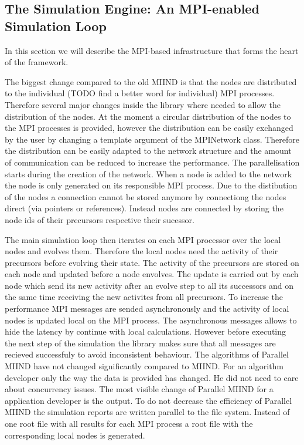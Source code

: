 \documentclass[12pt]{article}
\begin{document}
\subsection{The Simulation Engine: An MPI-enabled Simulation Loop}%
In this section we will describe the MPI-based infrastructure that forms the heart of the framework.

The biggest change compared to the old MIIND is that the nodes are distributed to the individual (TODO find a better word for individual) MPI processes. Therefore several major changes inside the library where needed to allow the distribution of the nodes. At the moment a circular distribution of the nodes to the MPI processes is provided, however the distribution can be easily exchanged by the user by changing a template argument of the MPINetwork class. Therefore the distribution can be easily adapted to the network structure and the amount of communication can be reduced to increase the performance.
The parallelisation starts during the creation of the network. When a node is added to the network the node is only generated on its responsible MPI process. Due to the distibution of the nodes a connection cannot be stored anymore by connectiong the nodes direct (via pointers or references). Instead nodes are connected by storing the node ids of their precursors respective their sucessor.

The main simulation loop then iterates on each MPI processor over the local nodes and evolves them. Therefore the local nodes need the activity of their precursors before evolving their state. The activity of the precursors are stored on each node and updated before a node envolves. The update is carried out by each node which send its new activity after an evolve step to all its successors and on the same time receiving the new activites from all precursors. To increase the performance MPI messages are sended asynchronously and the activity of local nodes is updated local on the MPI process.
The asynchronous messages allows to hide the latency by continue with local calculations. However before executing the next step of the simulation the library makes sure that all messages are recieved successfuly to avoid inconsistent behaviour.
The algorithms of Parallel MIIND have not changed significantly compared to MIIND. For an algorithm developer only the way the data is provided has changed. He did not need to care about concurrency issues.
The most visible change of Parallel MIIND for a application developer is the output. To do not decrease the efficiency of Parallel MIIND the simulation reports are written parallel to the file system. Instead of one root file with all results for each MPI process a root file with the corresponding local nodes is generated.
\end{document}
